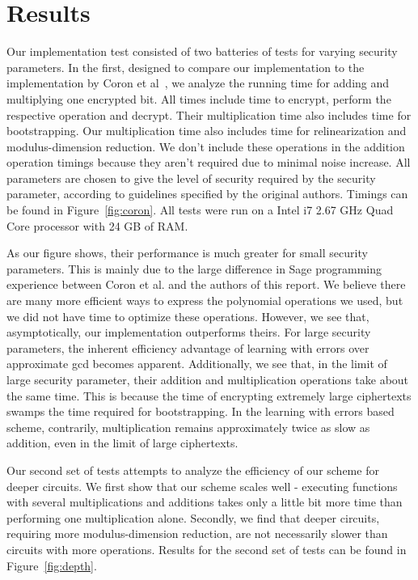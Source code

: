 \documentclass[letterpaper,twocolumn,10pt]{article}
\begin{document}
\section{Results}
\label{sec:results}
Our implementation test consisted of two batteries of tests for varying security parameters. In the first, designed to compare our implementation to the implementation by Coron et al~\cite{CNT}, we analyze the running time for adding and multiplying one encrypted bit. All times include time to encrypt, perform the respective operation and decrypt. Their multiplication time also includes time for bootstrapping. Our multiplication time also includes time for relinearization and modulus-dimension reduction. We don't include these operations in the addition operation timings because they aren't required due to minimal noise increase. All parameters are chosen to give the level of security required by the security parameter, according to guidelines specified by the original authors. Timings can be found in Figure~\ref{fig:coron}. All tests were run on a Intel i7 2.67 GHz Quad Core processor with 24 GB of RAM.

As our figure shows, their performance is much greater for small security parameters. This is mainly due to the large difference in Sage programming experience between Coron et al. and the authors of this report. We believe there are many more efficient ways to express the polynomial operations we used, but we did not have time to optimize these operations. However, we see that, asymptotically, our implementation outperforms theirs. For large security parameters, the inherent efficiency advantage of learning with errors over approximate gcd becomes apparent. Additionally, we see that, in the limit of large security parameter, their addition and multiplication operations take about the same time. This is because the time of encrypting extremely large ciphertexts swamps the time required for bootstrapping. In the learning with errors based scheme, contrarily, multiplication remains approximately twice as slow as addition, even in the limit of large ciphertexts.

Our second set of tests attempts to analyze the efficiency of our scheme for deeper circuits. We first show that our scheme scales well - executing functions with several multiplications and additions takes only a little bit more time than performing one multiplication alone. Secondly, we find that deeper circuits, requiring more modulus-dimension reduction, are not necessarily slower than circuits with more operations. Results for the second set of tests can be found in Figure~\ref{fig:depth}.
\end{document}
